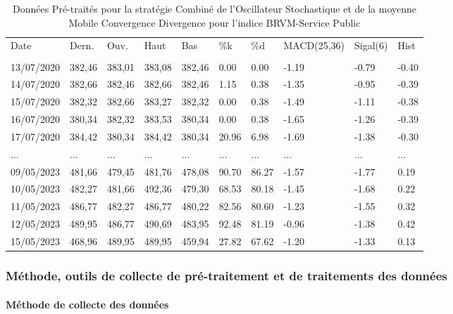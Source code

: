 \hypertarget{tab:multirow}{}
\begin{longtable}[]{@{}llllllllll@{}}
\caption{Données Pré-traités pour la stratégie Combiné de l'Oscillateur
Stochastique et de la moyenne Mobile Convergence Divergence pour
l'indice BRVM-Service Public}\tabularnewline
\toprule\noalign{}
\endfirsthead
\endhead
\bottomrule\noalign{}
\endlastfoot
Date & Dern. & Ouv. & Haut & Bas & \%k & \%d & MACD(25,36) & Sigal(6) &
Hist \\
& & & & & & & & & \\
13/07/2020 & 382,46 & 383,01 & 383,08 & 382,46 & 0.00 & 0.00 & -1.19 &
-0.79 & -0.40 \\
14/07/2020 & 382,66 & 382,46 & 382,66 & 382,46 & 1.15 & 0.38 & -1.35 &
-0.95 & -0.39 \\
15/07/2020 & 382,32 & 382,66 & 383,27 & 382,32 & 0.00 & 0.38 & -1.49 &
-1.11 & -0.38 \\
16/07/2020 & 380,34 & 382,32 & 383,53 & 380,34 & 0.00 & 0.38 & -1.65 &
-1.26 & -0.39 \\
17/07/2020 & 384,42 & 380,34 & 384,42 & 380,34 & 20.96 & 6.98 & -1.69 &
-1.38 & -0.30 \\
... & ... & ... & ... & ... & ... & ... & ... & ... & ... \\
09/05/2023 & 481,66 & 479,45 & 481,76 & 478,08 & 90.70 & 86.27 & -1.57 &
-1.77 & 0.19 \\
10/05/2023 & 482,27 & 481,66 & 492,36 & 479,30 & 68.53 & 80.18 & -1.45 &
-1.68 & 0.22 \\
11/05/2023 & 486,77 & 482,27 & 486,77 & 480,22 & 82.56 & 80.60 & -1.23 &
-1.55 & 0.32 \\
12/05/2023 & 489,95 & 486,77 & 490,69 & 483,95 & 92.48 & 81.19 & -0.96 &
-1.38 & 0.42 \\
15/05/2023 & 468,96 & 489,95 & 489,95 & 459,94 & 27.82 & 67.62 & -1.20 &
-1.33 & 0.13 \\
\end{longtable}

\subsubsection{Méthode, outils de collecte de pré-traitement et de
traitements des
données}\label{muxe9thode-outils-de-collecte-de-pruxe9-traitement-et-de-traitements-des-donnuxe9es}

\paragraph{Méthode de collecte des
données}\label{muxe9thode-de-collecte-des-donnuxe9es}

